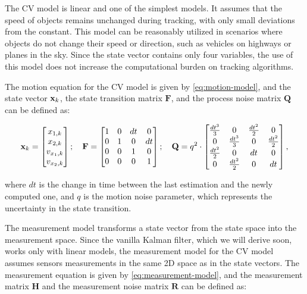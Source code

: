 The CV model is linear and one of the simplest models. It assumes that the speed of objects remains unchanged during tracking, with only small deviations from the constant. This model can be reasonably utilized in scenarios where objects do not change their speed or direction, such as vehicles on highways or planes in the sky. Since the state vector contains only four variables, the use of this model does not increase the computational burden on tracking algorithms.

The motion equation for the CV model is given by \ref{eq:motion-model}, and the state vector $\vecat{x}{k}$, the state transition matrix $\mathbf{F}$, and the process noise matrix $\mathbf{Q}$ can be defined as:

\begin{equation}
    \vecat{x}{k} =
    \begin{bmatrix}
        x_{1,k} \\ 
        x_{2,k} \\ 
        v_{x_1,k} \\ 
        v_{x_2,k}
    \end{bmatrix};
    \quad
    \mathbf{F} =
    \begin{bmatrix}
       1 & 0 & dt & 0 \\
       0 & 1 & 0 & dt \\
       0 & 0 & 1 &  0 \\
       0 & 0 & 0 &  1 
    \end{bmatrix};
    \quad
    \mathbf{Q} = q^2 \cdot
    \begin{bmatrix}
        \frac{dt^3}{3}    & 0                 & \frac{dt^{2}}{2}  & 0  \\
        0                 & \frac{dt^3}{3}    & 0                 & \frac{dt^{2}}{2} \\
        \frac{dt^{2}}{2}  & 0                 & dt                & 0 \\
        0                 & \frac{dt^{2}}{2}  & 0                 & dt
    \end{bmatrix},
\end{equation}

where $dt$ is the change in time between the last estimation and the newly computed one, and $q$ is the motion noise parameter, which represents the uncertainty in the state transition.

The measurement model transforms a state vector from the state space into the measurement space. Since the vanilla Kalman filter, which we will derive soon, works only with linear models, the measurement model for the CV model assumes sensors measurements in the same 2D space as in the state vectors. The measurement equation is given by \ref{eq:measurement-model}, and the measurement matrix $\mathbf{H}$ and the measurement noise matrix $\mathbf{R}$ can be defined as:

